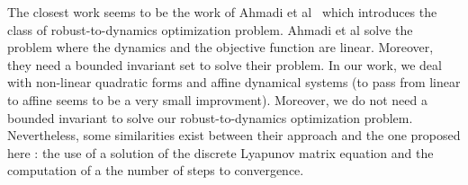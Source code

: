 \documentclass[10pt]{article}
\begin{document}
The closest work seems to be the work of Ahmadi et al~\cite{7403149,ahmadi2018robust} which introduces the class of robust-to-dynamics optimization problem. Ahmadi et al solve the problem where the dynamics and the objective function are linear. Moreover, they need a bounded invariant set to solve their problem. In our work, we deal with non-linear quadratic  forms and affine dynamical systems (to pass from linear to affine seems to be a very small improvment).  Moreover, we do not need a bounded invariant to solve our robust-to-dynamics optimization problem.  Nevertheless, some similarities exist between their approach and the one proposed here : the use of a solution of the discrete Lyapunov matrix equation and the computation of a the number of steps to convergence.  




\end{document}
